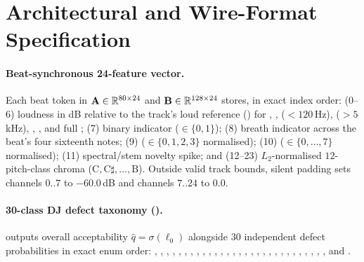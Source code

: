 \section{Architectural and Wire-Format Specification}
\label{sec:appendix}

\paragraph{Beat-synchronous 24-feature vector.}
Each beat token in $\mathbf{A} \in \mathbb{R}^{80\times 24}$ and $\mathbf{B} \in \mathbb{R}^{128\times 24}$ stores, in exact index order:
(0--6) loudness in dB relative to the track's loud reference () for , ,  ($<120$\,Hz),  ($>5$\,kHz), , , and full ;
(7) binary  indicator ($\in \{0,1\}$);
(8)  breath indicator across the beat's four sixteenth notes;
(9)  ($\in \{0,1,2,3\}$ normalised);
(10)  ($\in \{0,\dots,7\}$ normalised);
(11) spectral/stem novelty spike; and
(12--23) $L_2$-normalised $12$-pitch-class chroma ($\mathrm{C}, \mathrm{C}\sharp, \dots, \mathrm{B}$).
Outside valid track bounds, silent padding sets channels $0..7$ to $-60.0$\,dB and channels $7..24$ to $0.0$.

\paragraph{30-class DJ defect taxonomy ().}
{\raggedright
{} outputs overall acceptability $\hat{q} = \sigma(\ell_0)$ alongside $30$ independent defect probabilities in exact enum order:
, , , , , , , , , , , , , , , , , , , , , , , , , , , , , and .\par}

